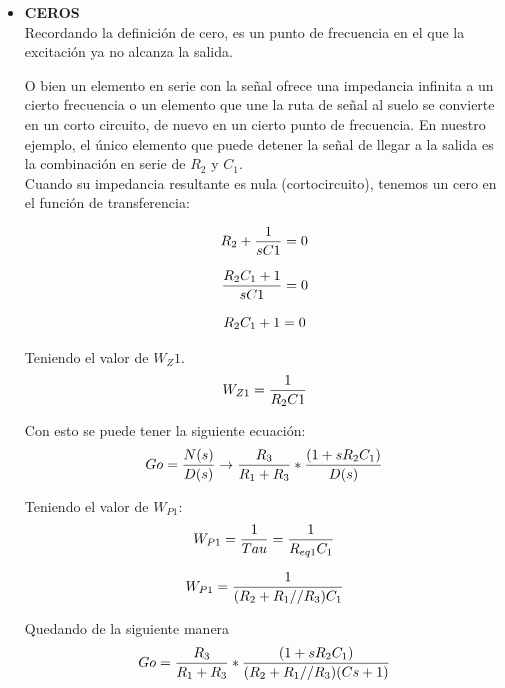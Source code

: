 \documentclass[letterpaper,10pt]{article}
\begin{document}
     
    \begin{itemize}
    	\item
    	\textbf{CEROS}\vspace*{0.4in}\\
    	Recordando la definición de cero, es un punto de frecuencia en el que
    	la excitación ya no alcanza la salida.
    	
    	O bien un elemento en serie con la señal ofrece una impedancia infinita a un cierto
    	frecuencia o un elemento que une la ruta de señal al suelo se convierte en un corto
    	circuito, de nuevo en un cierto punto de frecuencia. En nuestro ejemplo, el único elemento que
    	puede detener la señal de llegar a la salida es la combinación en serie de $R_2$ y $C_1$.\\ 
    	Cuando su impedancia resultante es nula (cortocircuito), tenemos un cero en el
    	función de transferencia:
    	
    	\begin{equation}
    	R_2+ \frac{1}{sC1}=0 \\  
    	\end{equation}
    
        \begin{equation}
   	 	\frac{R_2C_1+1}{sC1}=0 \\  
    	\end{equation}
    	
    	\begin{equation}
    	R_2C_1+1=0 \\  
    	\end{equation}
   
    	Teniendo el valor de $W_Z1$.
    	\begin{equation}
		W_{Z1}=\frac{1}{R_2C1} \\  
		\end{equation}
		
		Con esto se puede tener la siguiente ecuación:
		\begin{equation}
		Go= \frac {N(s)}{D(s)}\rightarrow \frac {R_3}{R_1 + R_3}*\frac {(1 + sR_2C_1)}{D(s)}\\  
		\end{equation}
		
		Teniendo el valor de $W_{P1}$:
		\begin{equation}
		W_{P1}=\frac {1}{Tau}=\frac {1}{R_{eq1}C_1}\\  
		\end{equation}
		
		\begin{equation}
		W_{P1}=\frac {1}{(R_2+R_1//R_3)C_1}\\  
		\end{equation}
		
		Quedando de la siguiente manera
		\begin{equation}
		Go=\frac {R_3}{R_1 + R_3}*\frac {(1 + sR_2C_1)}{(R_2+R_1//R_3)(Cs+1)}\\  
		\end{equation}
		
		\end{itemize}
\end{document}
